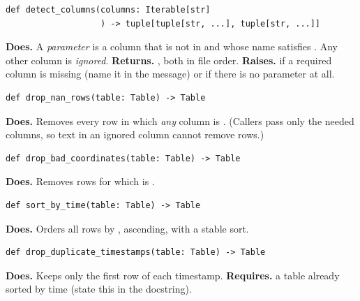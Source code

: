 \documentclass{article}
\newenvironment{card}{\par\smallskip\noindent\begin{minipage}{\linewidth}}{\end{minipage}\par}
\begin{document}
\begin{card}
\begin{lstlisting}[style=sig]
def detect_columns(columns: Iterable[str]
                   ) -> tuple[tuple[str, ...], tuple[str, ...]]
\end{lstlisting}
\textbf{Does.} A \emph{parameter} is a column that is not in
 and whose name satisfies . Any other
column is \emph{ignored}. \textbf{Returns.} , both
in file order. \textbf{Raises.}  if a required column is
missing (name it in the message) or if there is no parameter at all.
\end{card}

\begin{card}
\begin{lstlisting}[style=sig]
def drop_nan_rows(table: Table) -> Table
\end{lstlisting}
\textbf{Does.} Removes every row in which \emph{any} column is .
(Callers pass only the needed columns, so text in an ignored column cannot
remove rows.)
\end{card}

\begin{card}
\begin{lstlisting}[style=sig]
def drop_bad_coordinates(table: Table) -> Table
\end{lstlisting}
\textbf{Does.} Removes rows for which  is .
\end{card}

\begin{card}
\begin{lstlisting}[style=sig]
def sort_by_time(table: Table) -> Table
\end{lstlisting}
\textbf{Does.} Orders all rows by , ascending, with a stable
sort.
\end{card}

\begin{card}
\begin{lstlisting}[style=sig]
def drop_duplicate_timestamps(table: Table) -> Table
\end{lstlisting}
\textbf{Does.} Keeps only the first row of each timestamp. \textbf{Requires.}
a table already sorted by time (state this in the docstring).
\end{card}
\end{document}
